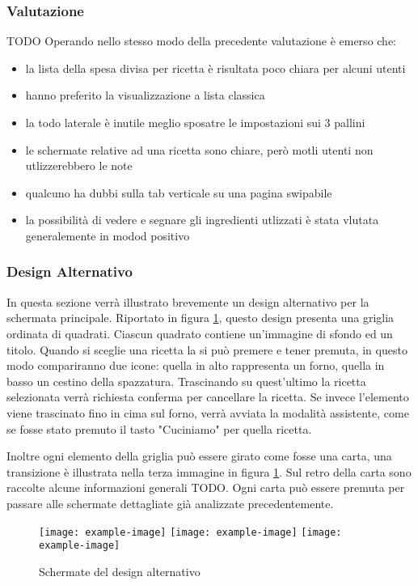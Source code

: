 \subsubsection{Valutazione}

TODO
Operando nello stesso modo della precedente valutazione è emerso che:
\begin{itemize}
  \item la lista della spesa divisa per ricetta è risultata poco chiara per alcuni utenti
  \item hanno preferito la visualizzazione a lista classica
  \item la todo laterale è inutile meglio sposatre le impostazioni sui 3 pallini
  \item le schermate relative ad una ricetta sono chiare, però motli utenti non utlizzerebbero le note
  \item qualcuno ha dubbi sulla tab verticale su una pagina swipabile
  \item la possibilità di vedere e segnare gli ingredienti utlizzati è stata vlutata generalemente in modod positivo
\end{itemize}


\clearpage
\subsubsection{Design Alternativo}
In questa sezione verrà illustrato brevemente un design alternativo per la schermata principale.
Riportato in figura \ref{fig:design_alternativo}, questo design presenta una griglia ordinata di quadrati.
Ciascun quadrato contiene un'immagine di sfondo ed un titolo.
Quando si sceglie una ricetta la si può premere e tener premuta, in questo modo compariranno due icone: quella in alto rappresenta un forno, quella in basso un cestino della spazzatura.
Trascinando su quest'ultimo la ricetta selezionata verrà richiesta conferma per cancellare la ricetta.
Se invece l'elemento viene trascinato fino in cima sul forno, verrà avviata la modalità assistente, come se fosse stato premuto il tasto "Cuciniamo" per quella ricetta.

Inoltre ogni elemento della griglia può essere girato come fosse una carta, una transizione è illustrata nella terza immagine in figura \ref{fig:design_alternativo}.
Sul retro della carta sono raccolte alcune informazioni generali TODO.
Ogni carta può essere premuta per passare alle schermate dettagliate già analizzate precedentemente.

\begin{figure}[ht]
  \begin{center}
    \texttt{[image: example-image]}
    \texttt{[image: example-image]}
    \texttt{[image: example-image]}
    \caption{Schermate del design alternativo}
    \label{fig:design_alternativo}
  \end{center}
\end{figure}

